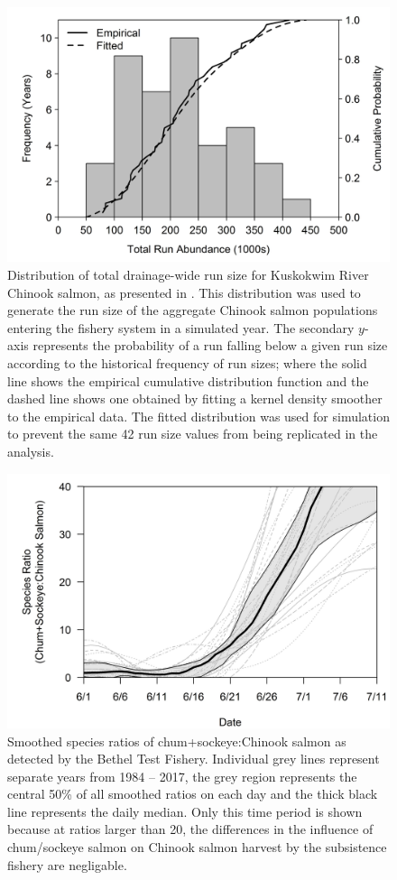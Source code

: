 \documentclass[12pt,]{book}
\theoremstyle{definition}
\theoremstyle{definition}
\theoremstyle{definition}
\theoremstyle{remark}
\begin{document}
\begin{figure}
  \centering
  \includegraphics{img/Ch3/N-plot.jpg}
  \caption{Distribution of total drainage-wide run size for Kuskokwim River Chinook salmon, as presented in \cite{liller-etal-2018}. This distribution was used to generate the run size of the aggregate Chinook salmon populations entering the fishery system in a simulated year. The secondary $y$-axis represents the probability of a run falling below a given run size according to the historical frequency of run sizes; where the solid line shows the empirical cumulative distribution function and the dashed line shows one obtained by fitting a kernel density smoother to the empirical data. The fitted distribution was used for simulation to prevent the same 42 run size values from being replicated in the analysis.}
  \label{fig:N-plot}
\end{figure}

\clearpage

\begin{figure}
  \centering
  \includegraphics{img/Ch3/ratios-plot.jpg}
  \caption{Smoothed species ratios of chum+sockeye:Chinook salmon as detected by the Bethel Test Fishery. Individual grey lines represent separate years from 1984 -- 2017, the grey region represents the central 50\% of all smoothed ratios on each day and the thick black line represents the daily median. Only this time period is shown because at ratios larger than 20, the differences in the influence of chum/sockeye salmon on Chinook salmon harvest by the subsistence fishery are negligable.}
  \label{fig:ratios-plot}
\end{figure}
\end{document}
